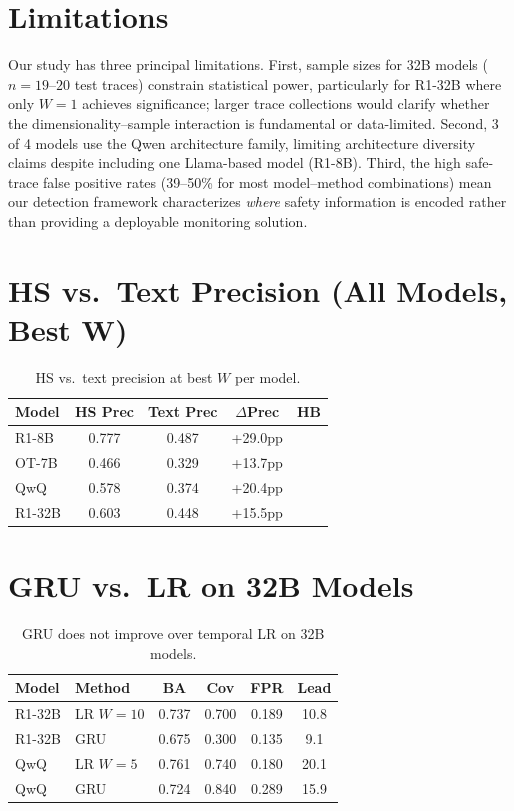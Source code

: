 \documentclass[11pt,a4paper]{article}
\newcommand{\pp}{\text{pp}}
\newcommand{\cmark}{\checkmark}
\begin{document}
\section*{Limitations}

Our study has three principal limitations.
First, sample sizes for 32B models ($n = 19$--$20$ test traces) constrain statistical power, particularly for R1-32B where only $W=1$ achieves significance; larger trace collections would clarify whether the dimensionality--sample interaction is fundamental or data-limited.
Second, 3 of 4 models use the Qwen architecture family, limiting architecture diversity claims despite including one Llama-based model (R1-8B).
Third, the high safe-trace false positive rates (39--50\% for most model--method combinations) mean our detection framework characterizes \emph{where} safety information is encoded rather than providing a deployable monitoring solution.

\appendix

\section{HS vs.\ Text Precision (All Models, Best W)}
\label{app:precision}

\begin{table}[h]
\centering
\small
\begin{tabular}{lcccc}
\toprule
\textbf{Model} & \textbf{HS Prec} & \textbf{Text Prec} & \textbf{$\Delta$Prec} & \textbf{HB} \\
\midrule
R1-8B & 0.777 & 0.487 & +29.0$\pp$ & \cmark \\
OT-7B & 0.466 & 0.329 & +13.7$\pp$ & \cmark \\
QwQ & 0.578 & 0.374 & +20.4$\pp$ & \cmark \\
R1-32B & 0.603 & 0.448 & +15.5$\pp$ & \cmark \\
\bottomrule
\end{tabular}
\caption{HS vs.\ text precision at best $W$ per model.}
\end{table}

\section{GRU vs.\ LR on 32B Models}
\label{app:gru}

\begin{table}[h]
\centering
\small
\begin{tabular}{llcccc}
\toprule
\textbf{Model} & \textbf{Method} & \textbf{BA} & \textbf{Cov} & \textbf{FPR} & \textbf{Lead} \\
\midrule
R1-32B & LR $W\!=\!10$ & 0.737 & 0.700 & 0.189 & 10.8 \\
R1-32B & GRU & 0.675 & 0.300 & 0.135 & 9.1 \\
QwQ & LR $W\!=\!5$ & 0.761 & 0.740 & 0.180 & 20.1 \\
QwQ & GRU & 0.724 & 0.840 & 0.289 & 15.9 \\
\bottomrule
\end{tabular}
\caption{GRU does not improve over temporal LR on 32B models.}
\end{table}
\end{document}
